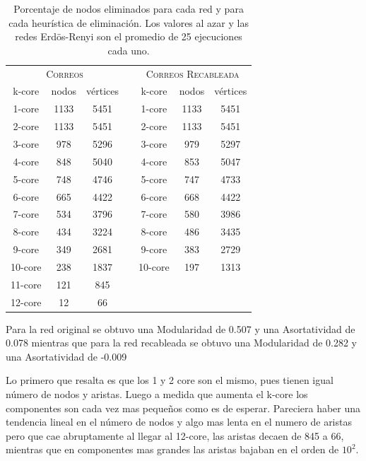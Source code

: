 \documentclass[letterpaper]{article}
\begin{document}
\begin{table}[H]
  \centering
  \renewcommand{\arraystretch}{1.1}
  \begin{tabular}{@{}ccccccc@{}}
    \toprule
       \multicolumn{3}{c}{\textsc{Correos}} & \phantom{abc} & \multicolumn{3}{c}{\textsc{Correos Recableada}}\\
       \cmidrule{1-3}\cmidrule{5-7}
       k-core & nodos & vértices & & k-core & nodos & vértices\\
       \midrule
       1-core  & 1133 &  5451   && 1-core  & 1133 & 5451 \\
        2-core  & 1133 &  5451  && 2-core  & 1133 & 5451 \\
        3-core  & 978  &  5296  && 3-core  & 979  & 5297 \\
        4-core  & 848  &  5040  && 4-core  & 853  & 5047 \\
        5-core  & 748  &  4746  && 5-core  & 747  & 4733 \\
        6-core  & 665  &  4422  && 6-core  & 668  & 4422 \\
        7-core  & 534  &  3796  && 7-core  & 580  & 3986 \\
        8-core  & 434  &  3224  && 8-core  & 486  & 3435 \\
        9-core  & 349  &  2681  && 9-core  & 383  & 2729 \\
        10-core & 238  &  1837  && 10-core & 197  & 1313 \\
        11-core & 121  &  845  \\
        12-core & 12   &  66   \\
    \bottomrule
  \end{tabular}
  \caption{Porcentaje de nodos eliminados para cada red y para cada heurística de eliminación. Los valores al azar y las redes Erdös-Renyi son el promedio de 25 ejecuciones cada uno.}
  \label{table:3}
\end{table}

Para la red original se obtuvo una Modularidad de 0.507 y una Asortatividad de 0.078
mientras que para la red recableada se obtuvo una Modularidad de 0.282 y una Asortatividad de -0.009

Lo primero que resalta es que los 1 y 2 core son el mismo, pues tienen igual número de nodos y aristas. Luego a medida que aumenta el k-core los componentes son cada vez mas pequeños como es de esperar. Pareciera haber una tendencia lineal en el número de nodos y algo mas lenta en el numero de aristas pero que cae abruptamente al llegar al 12-core, las aristas decaen de 845 a 66, mientras que en componentes mas grandes las aristas bajaban en el orden de $10^2$.
\end{document}
